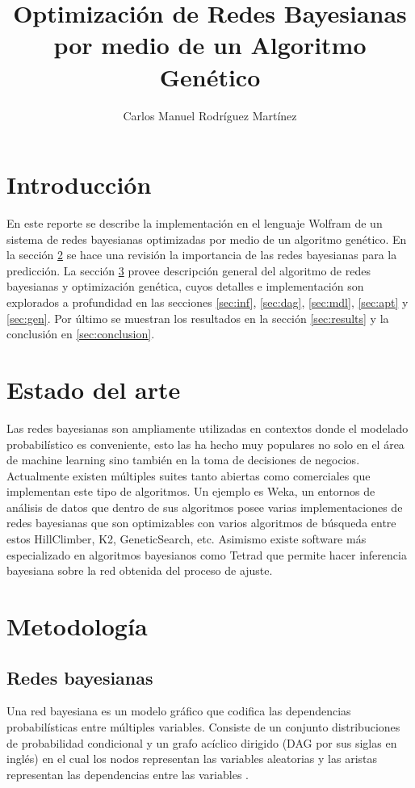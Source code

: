 \documentclass[10pt,a4paper]{article}
\author{Carlos Manuel Rodríguez Martínez}
\title{Optimización de Redes Bayesianas por medio de un Algoritmo Genético}
\begin{document}
\maketitle

\section{Introducción}
En este reporte se describe la implementación en el lenguaje Wolfram de un sistema de redes bayesianas optimizadas por medio de un algoritmo genético. En la sección \ref{sec:state} se hace una revisión la importancia de las redes bayesianas para la predicción. La sección \ref{sec:met} provee descripción general del algoritmo de redes bayesianas y optimización genética, cuyos detalles e implementación son explorados a profundidad en las secciones \ref{sec:inf}, \ref{sec:dag}, \ref{sec:mdl}, \ref{sec:apt} y \ref{sec:gen}. Por último se muestran los resultados en la sección \ref{sec:results} y la conclusión en \ref{sec:conclusion}.

\section{Estado del arte} \label{sec:state}
Las redes bayesianas son ampliamente utilizadas en contextos donde el modelado probabilístico es conveniente, esto las ha hecho muy populares no solo en el área de machine learning sino también en la toma de decisiones de negocios. Actualmente existen múltiples suites tanto abiertas como comerciales que implementan este tipo de algoritmos. Un ejemplo es Weka, un entornos de análisis de datos que dentro de sus algoritmos posee varias implementaciones de redes bayesianas que son optimizables con varios algoritmos de búsqueda entre estos HillClimber, K2, GeneticSearch, etc. Asimismo existe software más especializado en algoritmos bayesianos como Tetrad que permite hacer inferencia bayesiana sobre la red obtenida del proceso de ajuste.

\section{Metodología} \label{sec:met}

\subsection{Redes bayesianas}
Una red bayesiana es un modelo gráfico que codifica las dependencias probabilísticas entre múltiples variables. Consiste de un conjunto distribuciones de probabilidad condicional y un grafo acíclico dirigido (DAG por sus siglas en inglés) en el cual los nodos representan las variables aleatorias y las aristas representan las dependencias entre las variables \cite{MDL}.
\end{document}
